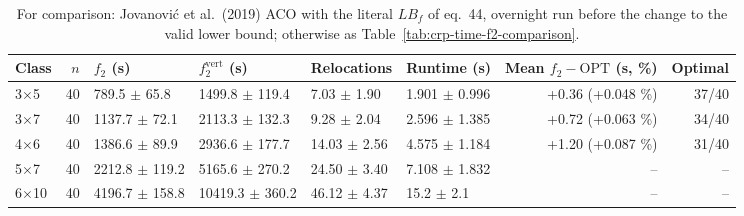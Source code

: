 \begin{table}[htbp]
\centering
\small
\begin{tabular}{lrllllrr}
\toprule
Class & $n$ & $f_2$ (s) & $f_2^{\mathrm{vert}}$ (s) & Relocations & Runtime (s) & Mean $f_2 - \mathrm{OPT}$ (s, \%) & Optimal \\
\midrule
3$\times$5 & 40 & 789.5 $\pm$ 65.8 & 1499.8 $\pm$ 119.4 & 7.03 $\pm$ 1.90 & 1.901 $\pm$ 0.996 & +0.36 (+0.048 \%) & 37/40 \\
3$\times$7 & 40 & 1137.7 $\pm$ 72.1 & 2113.3 $\pm$ 132.3 & 9.28 $\pm$ 2.04 & 2.596 $\pm$ 1.385 & +0.72 (+0.063 \%) & 34/40 \\
4$\times$6 & 40 & 1386.6 $\pm$ 89.9 & 2936.6 $\pm$ 177.7 & 14.03 $\pm$ 2.56 & 4.575 $\pm$ 1.184 & +1.20 (+0.087 \%) & 31/40 \\
5$\times$7 & 40 & 2212.8 $\pm$ 119.2 & 5165.6 $\pm$ 270.2 & 24.50 $\pm$ 3.40 & 7.108 $\pm$ 1.832 & -- & -- \\
6$\times$10 & 40 & 4196.7 $\pm$ 158.8 & 10419.3 $\pm$ 360.2 & 46.12 $\pm$ 4.37 & 15.2 $\pm$ 2.1 & -- & -- \\
\bottomrule
\end{tabular}
\caption{For comparison: Jovanovi\'{c} et al.\ (2019) ACO with the literal $LB_f$ of eq.~44, overnight run before the change to the valid lower bound; otherwise as Table~\ref{tab:crp-time-f2-comparison}.}
\label{tab:crp-time-f2-jovanovic-literal}
\end{table}
